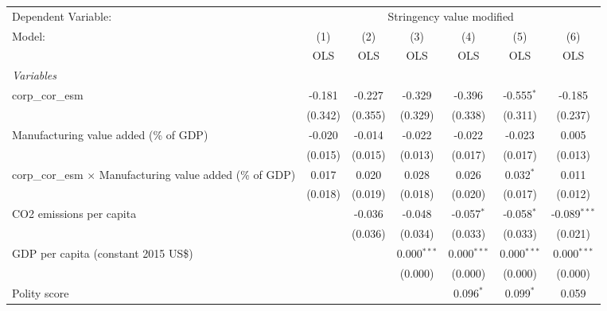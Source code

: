 
\begingroup
\centering
\begin{tabular}{lcccccc}
   \toprule
   Dependent Variable: & \multicolumn{6}{c}{Stringency value modified}\\
   Model:                                                            & (1)     & (2)     & (3)           & (4)           & (5)           & (6)\\  
                                                                     &  OLS    & OLS     & OLS           & OLS           & OLS           & OLS\\  
   \midrule
   \emph{Variables}\\
   corp\_cor\_esm                                                    & -0.181  & -0.227  & -0.329        & -0.396        & -0.555$^{*}$  & -0.185\\   
                                                                     & (0.342) & (0.355) & (0.329)       & (0.338)       & (0.311)       & (0.237)\\   
   Manufacturing value added (\% of GDP)                             & -0.020  & -0.014  & -0.022        & -0.022        & -0.023        & 0.005\\   
                                                                     & (0.015) & (0.015) & (0.013)       & (0.017)       & (0.017)       & (0.013)\\   
   corp\_cor\_esm $\times$ Manufacturing value added (\% of GDP)     & 0.017   & 0.020   & 0.028         & 0.026         & 0.032$^{*}$   & 0.011\\   
                                                                     & (0.018) & (0.019) & (0.018)       & (0.020)       & (0.017)       & (0.012)\\   
   CO2 emissions per capita                                          &         & -0.036  & -0.048        & -0.057$^{*}$  & -0.058$^{*}$  & -0.089$^{***}$\\   
                                                                     &         & (0.036) & (0.034)       & (0.033)       & (0.033)       & (0.021)\\   
   GDP per capita (constant 2015 US\$)                               &         &         & 0.000$^{***}$ & 0.000$^{***}$ & 0.000$^{***}$ & 0.000$^{***}$\\   
                                                                     &         &         & (0.000)       & (0.000)       & (0.000)       & (0.000)\\   
   Polity score                                                      &         &         &               & 0.096$^{*}$   & 0.099$^{*}$   & 0.059\\   

\end{tabular}

